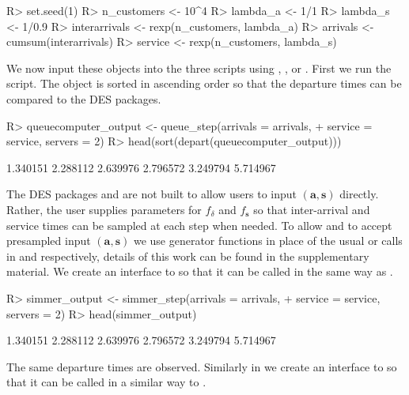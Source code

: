\documentclass[article]{jss}
\begin{document}
\begin{Code}
R> set.seed(1)
R> n_customers <- 10^4
R> lambda_a <- 1/1
R> lambda_s <- 1/0.9
R> interarrivals <- rexp(n_customers, lambda_a)
R> arrivals <- cumsum(interarrivals)
R> service <- rexp(n_customers, lambda_s)
\end{Code}

We now input these objects into the three scripts using , , or . First we run the  script. The  object is sorted in ascending order so that the departure times can be compared to the DES packages.

\begin{CodeChunk}
\begin{Sinput}
R> queuecomputer_output <- queue_step(arrivals = arrivals, 
+    service = service, servers = 2)
R> head(sort(depart(queuecomputer_output)))
\end{Sinput}
\begin{Soutput}
[1] 1.340151 2.288112 2.639976 2.796572 3.249794 5.714967
\end{Soutput}
\end{CodeChunk}

The DES packages  and  are not built to allow users to input $(\mathbf{a,s})$ directly. Rather, the user supplies parameters for $f_{\delta}$ and $f_{\mathbf{s}}$ so that inter-arrival and service times can be sampled at each step when needed. To allow  and  to accept presampled input $(\mathbf{a,s})$ we use generator functions in place of the usual  or  calls in  and  respectively, details of this work can be found in the supplementary material. We create an interface to  so that it can be called in the same way as . 

\begin{CodeChunk}
\begin{Sinput}
R> simmer_output <- simmer_step(arrivals = arrivals, 
+    service = service, servers = 2)
R> head(simmer_output)
\end{Sinput}
\begin{Soutput}
[1] 1.340151 2.288112 2.639976 2.796572 3.249794 5.714967
\end{Soutput}
\end{CodeChunk}

The same departure times are observed. Similarly in  we create an interface to  so that it can be called in a similar way to . 
\end{document}
